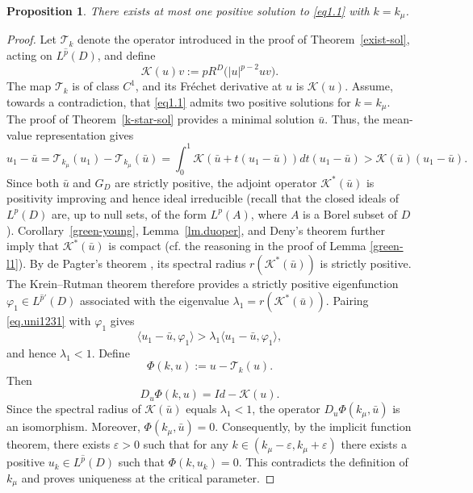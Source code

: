 \documentclass[11pt,a4paper,reqno]{amsart}
\newtheorem{proposition}[theorem]{\bf Proposition}
\theoremstyle{definition}
\numberwithin{equation}{section}
\begin{document}
\begin{proposition}
\label{prop.uncrit}
There exists at most one positive solution to \eqref{eq1.1} with $k=k_\mu$.
\end{proposition}
\begin{proof}
Let \(\mathcal T_k\) denote the operator introduced in the proof of Theorem~\ref{exist-sol}, acting on \(L^{\hat p}(D)\), 
and define 
\[
\mathcal K(u)v:=pR^D\bigl(|u|^{p-2}uv\bigr). 
\]
The map \(\mathcal T_k\) is of class \(C^1\), and its Fr\'echet derivative 
at \(u\) is \(\mathcal K(u)\).
Assume, towards a contradiction, that \eqref{eq1.1} admits two positive solutions for \(k=k_\mu\). 
The proof of Theorem~\ref{k-star-sol} provides a minimal solution \(\bar u\). 
Thus, the mean-value representation gives 
\begin{equation}
\label{eq.uni1231}
u_1-\bar u=\mathcal T_{k_\mu}\left(u_1\right)-\mathcal T_{k_\mu}\left(\bar u\right)=\int_0^1 \mathcal K\left(\bar u+t\left(u_1-\bar u\right)\right) d t\left(u_1-\bar u\right)> \mathcal K\left(\bar u\right)\left(u_1-\bar u\right).
\end{equation}
Since both \(\bar u\) and \(G_D\) are strictly positive, the adjoint operator \(\mathcal K^*(\bar u)\) 
is positivity improving and hence ideal irreducible (recall that the closed ideals of $L^p(D)$ are, up to null sets,
of the form $L^p(A)$, where $A$ is a Borel subset of $D$). 
Corollary~\ref{green-young}, Lemma~\ref{lm.duoper}, and Deny's theorem further imply that \(\mathcal K^*(\bar u)\) is compact
(cf.  the reasoning in the proof of Lemma \ref{green-l1}).
By de Pagter's theorem \cite[Theorem~4.2.2]{MeyerNieberg1991}, its spectral radius $r(\mathcal K^*(\bar u))$ is strictly positive. 
The Krein--Rutman theorem \cite[Theorem~4.1.4]{MeyerNieberg1991} therefore provides a strictly positive eigenfunction 
\(\varphi_1\in L^{\hat p'}(D)\) associated with the eigenvalue $\lambda_1=r(\mathcal K^*(\bar u))$. 
Pairing \eqref{eq.uni1231} with \(\varphi_1\) gives 
\[
\langle u_1-\bar u,\varphi_1\rangle > \lambda_1\langle u_1-\bar u,\varphi_1\rangle, 
\]
and hence \(\lambda_1<1\). Define 
\[
\Phi(k,u):=u-\mathcal T_k(u).
\]
Then 
\[
D_u\Phi(k,u)=Id-\mathcal K(u). 
\]
Since the spectral radius of \(\mathcal K(\bar u)\) equals \(\lambda_1<1\), 
the operator \(D_u\Phi(k_\mu,\bar u)\) is an isomorphism. 
Moreover, \(\Phi(k_\mu,\bar u)=0\). 
Consequently, by the implicit function theorem,  there exists $\varepsilon>0$  such that for any $k\in (k_\mu-\varepsilon, k_\mu+\varepsilon)$
there exists a  positive $u_k\in L^{\hat p}(D)$ such that $\Phi(k,u_k)=0$.
This contradicts the definition of \(k_\mu\) and proves uniqueness at the critical parameter.
\end{proof}
\end{document}
